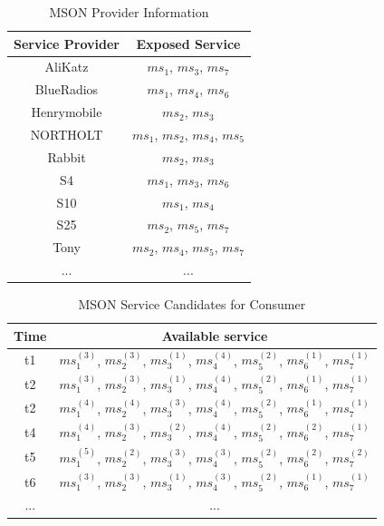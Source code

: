 \documentclass[10pt,journal,compsoc]{IEEEtran}
\begin{document}
\begin{table}[!t]
\renewcommand{\arraystretch}{1.3}
\caption{MSON Provider Information}
\label{table_example}
\centering
\begin{tabular}{|c||c|}
\hline
\bfseries Service Provider & \bfseries Exposed Service\\
\hline
\hline
AliKatz     & $ms_1$, $ms_3$, $ms_7$\\
\hline 
BlueRadios  & $ms_1$, $ms_4$, $ms_6$\\
\hline
Henrymobile & $ms_2$, $ms_3$\\
\hline
NORTHOLT    & $ms_1$, $ms_2$, $ms_4$, $ms_5$ \\
\hline
Rabbit      & $ms_2$, $ms_3$\\
\hline 
S4          & $ms_1$, $ms_3$, $ms_6$\\
\hline 
S10         & $ms_1$, $ms_4$\\
\hline 
S25         & $ms_2$, $ms_5$, $ms_7$\\
\hline 
Tony        & $ms_2$, $ms_4$, $ms_5$, $ms_7$\\
\hline 
... & ...\\
\hline
\end{tabular}
\end{table}

\begin{table}[!t]
\renewcommand{\arraystretch}{1.3}
\caption{MSON Service Candidates for Consumer}
\label{table_example}
\centering
\begin{tabular}{|c||c|}
\hline
\bfseries Time & \bfseries Available service\\
\hline
\hline
t1     & $ms_1^{(3)}$, $ms_2^{(3)}$, $ms_3^{(1)}$, $ms_4^{(4)}$, $ms_5^{(2)}$, $ms_6^{(1)}$, $ms_7^{(1)}$\\
\hline 
t2     & $ms_1^{(3)}$, $ms_2^{(3)}$, $ms_3^{(1)}$, $ms_4^{(4)}$, $ms_5^{(2)}$, $ms_6^{(1)}$, $ms_7^{(1)}$\\
\hline
t2     & $ms_1^{(4)}$, $ms_2^{(4)}$, $ms_3^{(3)}$, $ms_4^{(4)}$, $ms_5^{(2)}$, $ms_6^{(1)}$, $ms_7^{(1)}$\\
\hline
t4     & $ms_1^{(4)}$, $ms_2^{(3)}$, $ms_3^{(2)}$, $ms_4^{(4)}$, $ms_5^{(2)}$, $ms_6^{(2)}$, $ms_7^{(1)}$\\
\hline
t5     & $ms_1^{(5)}$, $ms_2^{(2)}$, $ms_3^{(3)}$, $ms_4^{(3)}$, $ms_5^{(2)}$, $ms_6^{(2)}$, $ms_7^{(2)}$\\
\hline 
t6     & $ms_1^{(3)}$, $ms_2^{(3)}$, $ms_3^{(1)}$, $ms_4^{(3)}$, $ms_5^{(2)}$, $ms_6^{(1)}$, $ms_7^{(1)}$\\
\hline 
... & ...\\
\hline
\end{tabular}
\end{table}
\end{document}
